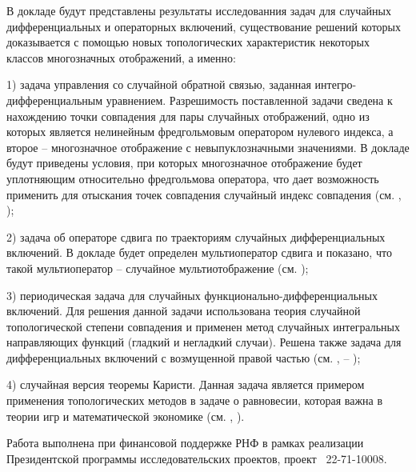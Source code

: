 В докладе будут представлены результаты исследованния задач для случайных дифференциальных и операторных включений, существование решений которых доказывается с помощью новых топологических характеристик некоторых классов многозначных отображений, а именно:

1) задача управления со случайной обратной связью, заданная интегро-диф\-фе\-рен\-циаль\-ным уравнением. Разрешимость поставленной задачи сведена к нахождению точки совпадения для пары случайных отображений, одно из которых является нелинейным фредгольмовым оператором нулевого индекса, а второе -- многозначное отображение с невыпуклозначными значениями. В докладе будут приведены условия, при которых многозначное отображение будет уплотняющим относительно фредгольмова оператора, что дает возможность применить для отыскания точек совпадения случайный индекс совпадения (см. \cite{OKG_OtnInd}, \cite{OKG8});

2) задача об операторе сдвига по траекториям случайных дифференциальных включений. В докладе будет определен мультиоператор сдвига и показано, что такой мультиоператор -- случайное мультиотобра\-жение (см. \cite{OKG_OpSdv});

3) периодическая задача для случайных функционально-дифференциальных включений. Для решения данной задачи использована теория случайной топологической степени совпадения и применен метод случайных интегральных направляющих функций (гладкий и негладкий случаи). Решена также задача  для дифференциаль\-ных включений с возмущенной правой частью (см. \cite{OKG_f}, \cite{OKG} -- \cite{G_Bel});

4) случайная версия теоремы Каристи. Данная задача является примером применения топологических методов в задаче о равновесии, которая важна в теории игр и математической экономике (см. \cite{GO_Rand_eq_point}, \cite{GOY}).





%
Работа выполнена при финансовой поддержке РНФ в рамках реализации Президентской программы исследовательских проектов, проект \textnumero~22-71-10008.


